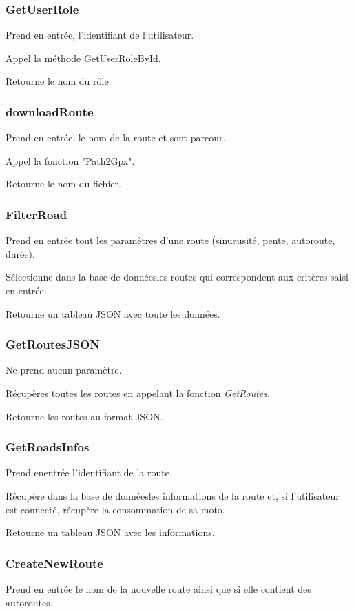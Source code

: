 \documentclass[a4paper]{article}
\newcommand{\bdd}{base de données}
\begin{document}
\subsubsection{GetUserRole}
Prend en entrée, l'identifiant de l'utilisateur.

Appel la méthode GetUserRoleById.

Retourne le nom du rôle.

\subsubsection{downloadRoute}
Prend en entrée, le nom de la route et sont parcour.

Appel la fonction "Path2Gpx".

Retourne le nom du fichier.

\subsubsection{FilterRoad}
Prend en entrée tout les paramètres d'une route (sinueusité, pente, autoroute, durée).

Sélectionne dans la \bdd les routes qui correspondent aux critères saisi en entrée.

Retourne un tableau JSON avec toute les données.


\subsubsection{GetRoutesJSON}
Ne prend aucun paramètre.

Récupères toutes les routes en appelant la fonction \emph{GetRoutes}.

Retourne les routes au format JSON.


\subsubsection{GetRoadsInfos}
Prend enentrée l'identifiant de la route.

Récupère dans la \bdd les informations de la route et, si l'utilisateur est connecté, récupère la consommation de sa moto.

Retourne un tableau JSON avec les informations.

\subsubsection{CreateNewRoute}
Prend en entrée le nom de la nouvelle route ainsi que si elle contient des autoroutes.
\end{document}
